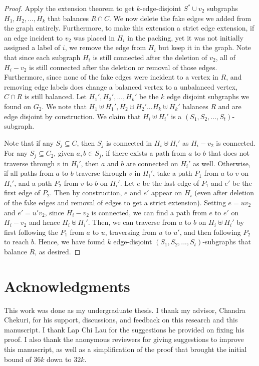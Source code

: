 \documentclass{article}
\begin{document}
\begin{proof}
    Apply the extension theorem to get $k$-edge-disjoint $S^* \cup v_2$ subgraphs $H_1,H_2,...,H_k$ that balances $R \cap C$. We now delete the fake edges we added from the graph entirely. Furthermore, to make this extension a strict edge extension, if an edge incident to $v_2$ was placed in $H_i$ in the packing, yet it was not initially assigned a label of $i$, we remove the edge from $H_i$ but keep it in the graph. Note that since each subgraph $H_i$ is still connected after the deletion of $v_2$, all of $H_i-v_2$ is still connected after the deletion or removal of those edges. Furthermore, since none of the fake edges were incident to a vertex in $R$, and removing edge labels does change a balanced vertex to a unbalanced vertex, $C \cap R$ is still balanced. Let $H_1',H_2',...,H_k'$ be the $k$ edge disjoint subgraphs we found on $G_2$. We note that $H_1 \uplus H_1', H_2 \uplus H_2'... H_k \uplus H_k'$ balances $R$ and are edge disjoint by construction. We claim that $H_i \uplus H_i'$ is a $(S_1,S_2,...,S_t)$-subgraph. 

    Note that if any $S_j \subseteq C$, then $S_j$ is connected in $H_i \uplus H_i'$ as $H_i-v_2$ is connected. For any $S_j \subseteq C_2$, given $a, b \in S_j$, if there exists a path from $a$ to $b$ that does not traverse through $v$ in $H_i'$, then $a$ and $b$ are connected on $H_i'$ as well. Otherwise, if all paths from $a$ to $b$ traverse through $v$ in $H_i'$, take a path $P_1$ from $a$ to $v$ on $H_i'$, and a path $P_2$ from $v$ to $b$ on $H_i'$. Let $e$ be the last edge of $P_1$ and $e'$ be the first edge of $P_2$. Then by construction, $e$ and $e'$ appear on $H_i$ (even after deletion of the fake edges and removal of edges to get a strict extension). Setting $e = uv_2$ and $e' = u'v_2$, since $H_i-v_2$ is connected, we can find a path from $e$ to $e'$ on $H_i-v_2$ and hence $H_i \uplus H_i'$. Then, we can traverse from $a$ to $b$ on $H_i \uplus H_i'$ by first following the $P_1$ from $a$ to $u$, traversing from $u$ to $u'$, and then following $P_2$ to reach $b$. Hence, we have found $k$ edge-disjoint $(S_1,S_2,...,S_t)$-subgraphs that balance $R$, as desired. 
\end{proof}

\section*{Acknowledgments}
This work was done as my undergraduate thesis. I thank my advisor, Chandra Chekuri, for his support, discussions, and feedback on this research and this manuscript. I thank Lap Chi Lau for the suggestions he provided on fixing his proof. I also thank the anonymous reviewers for giving suggestions to improve this manuscript, as well as a simplification of the proof that brought the initial bound of $36k$ down to $32k$.


\end{document}
